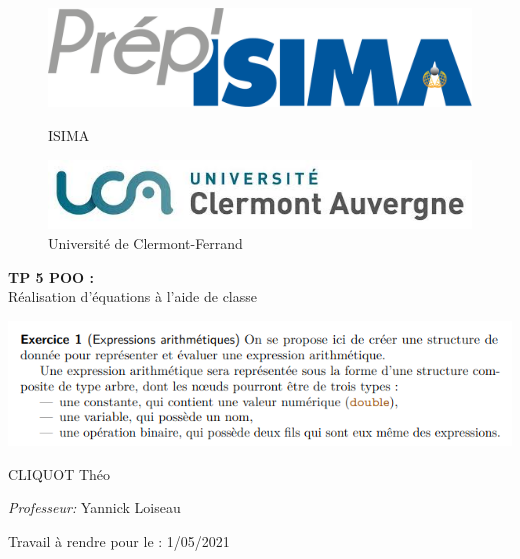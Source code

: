 \documentclass[a4paper]{article}
\begin{document}
  \begin{titlepage}
    \begin{center}
  \begin{figure}[!htb]
    \begin{minipage}{0.5\textwidth}
      \centering
      \includegraphics[width=.7\linewidth]{./img_rapport/prepisima.png}
      \caption{ ISIMA }\label{fig-ISIMA}
    \end{minipage}\hfill
    \begin{minipage}{0.5\textwidth}
      \centering
      \includegraphics[width=.7\linewidth]{./img_rapport/UCA.jpeg}
      \caption{Université de Clermont-Ferrand}\label{fig-UCA}
    \end{minipage}
  \end{figure}

  \vspace{2cm}



    \color{red}
    {\huge \bfseries TP 5 POO : \\[0.4cm]}
    \color{black}
    \vspace{0.5cm}
    {\huge Réalisation d'équations à l'aide de classe}

    \vspace{4cm}

    \includegraphics[scale=0.7]{./img_rapport/explic.png}

    \vspace{5cm}
    \color{my_gray}
        CLIQUOT Théo



    \emph{Professeur:} Yannick Loiseau

    Travail à rendre pour le : 1/05/2021
    \color{black}
  \end{center}
\end{titlepage}
\end{document}
